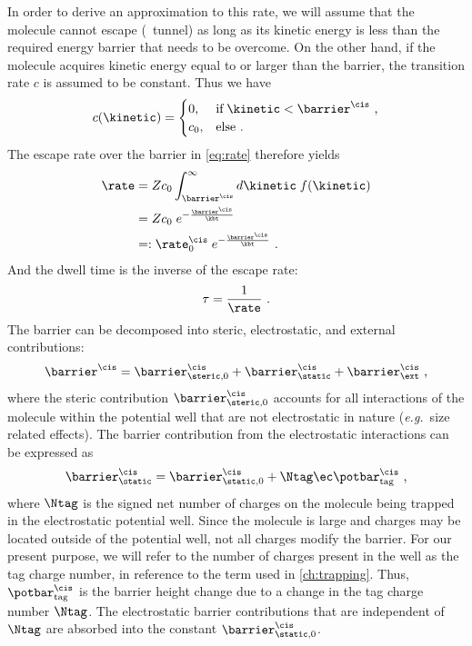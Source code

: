 In order to derive an approximation to this rate, we will assume that the molecule cannot escape (\ie~tunnel)
as long as its kinetic energy is less than the required energy barrier that needs to be overcome. On the other
hand, if the molecule acquires kinetic energy equal to or larger than the barrier, the transition rate $c$ is
assumed to be constant. Thus we have
%
\begin{align*}
    c(\kinetic) =
        \begin{cases}
            0, & \text{if}\; \kinetic < \barrier^\cis \text{ ,}\\
            c_0, & \text{else} \text{ .}
        \end{cases}
\end{align*}
%
The escape rate over the barrier in \cref{eq:rate} therefore yields
%
\begin{align*}
    \rate ={}& Z c_0 \int_{\barrier^\cis}^\infty d\kinetic\;f(\kinetic)\\
    ={}& Z c_0\; e^{-\frac{\barrier^\cis}{\kbt}}\\
    =:& \;\rate^{\cis}_0\; e^{-\frac{\barrier^\cis}{\kbt}}
    \text{ .}
\end{align*}
%
And the dwell time is the inverse of the escape rate:
%
\begin{align*}
    \tau = \frac{1}{\rate}
    \text{ .}
\end{align*}
%
The barrier can be decomposed into steric, electrostatic, and external
contributions:
%
\begin{align}\label{eq:barrier}
    \barrier^\cis = \barrier^{\cis}_{\steric,0} + \barrier^\cis_\static +
    \barrier^\cis_\ext
    \text{ ,}
\end{align}
%
where the steric contribution $\barrier^{\cis}_{\steric,0}$ accounts for all interactions of the molecule
within the potential well that are not electrostatic in nature (\textit{e.g.}~size related effects). The
barrier contribution from the electrostatic interactions can be expressed as
%
\begin{align}\label{eq:barrier_static}
    \barrier^\cis_{\static} =
    \barrier^{\cis}_{\static,0} + \Ntag \ec \potbar_{\rm{tag}}^\cis
    \text{ ,}
\end{align}
%
where $\Ntag$ is the signed net number of charges on the molecule being trapped in the electrostatic potential
well. Since the molecule is large and charges may be located outside of the potential well, not all charges
modify the barrier. For our present purpose, we will refer to the number of charges present in the well as the tag
charge number, in reference to the term used in \cref{ch:trapping}. Thus, $\potbar_{\rm tag}^\cis$ is the
barrier height change due to a change in the tag charge number $\Ntag$. The electrostatic barrier
contributions that are independent of $\Ntag$ are absorbed into the constant $\barrier^{\cis}_{\static,0}$.

